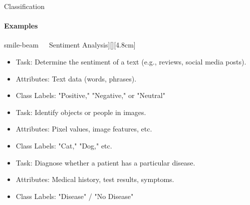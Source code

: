 \documentclass[aspectratio=169]{beamer}
\begin{document}
\begin{frame}{Classification}
    \framesubtitle{Examples}

    \vspace{-0.8cm}
    \begin{minipage}[t]{0.32\textwidth}
    
        \begin{coloredblock}[yellow][\centering\faIcon[regular]{smile-beam}~~~Sentiment Analysis][\footnotesize][4.8cm]
            \begin{itemize}
                \item \scriptsize Task: Determine the sentiment of a text (e.g., reviews, social media posts).
                \item \scriptsize Attributes: Text data (words, phrases).
                \item \scriptsize Class Labels: "Positive," "Negative," or "Neutral"
            \end{itemize}
        \end{coloredblock}

        \begin{coloredblock}
                \begin{itemize}
                    \item \scriptsize Task: Identify objects or people in images.
                    \item \scriptsize Attributes: Pixel values, image features, etc.
                    \item \scriptsize Class Labels: "Cat," "Dog," etc.
                \end{itemize}
        \end{coloredblock}
        
    \end{minipage}
    \hfill
    \begin{minipage}[t]{0.32\textwidth}
        \begin{coloredblock}
            \begin{itemize}
                \item \scriptsize Task: Diagnose whether a patient has a particular disease.
                \item \scriptsize Attributes: Medical history, test results, symptoms.
                \item \scriptsize Class Labels: "Disease" / "No Disease"
            \end{itemize}
        \end{coloredblock}


\end{minipage}
\end{frame}
\end{document}
